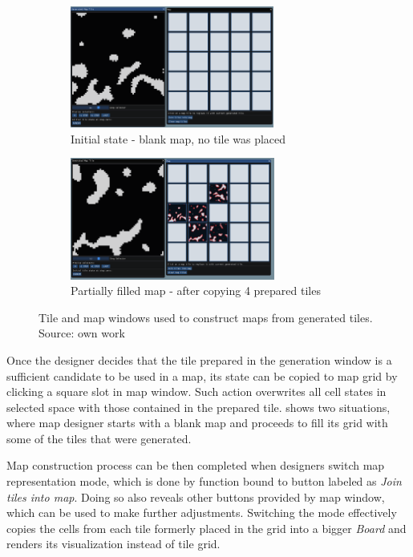 \documentclass[12pt]{report}
\begin{document}
\begin{figure}[H]
	\centering
	\begin{subfigure}[t]{0.9\textwidth}
		\centering
		\includegraphics[height=4cm]{images/mapnotiles}
		\caption{Initial state - blank map, no tile was placed} 
	\end{subfigure}  
	\begin{subfigure}[t]{0.9\textwidth}
		\centering
		\includegraphics[height=4cm]{images/map4tiles}
		\caption{Partially filled map - after copying 4 prepared tiles} 
	\end{subfigure} 
	\caption{Tile and map windows used to construct maps from generated tiles. Source: own work}
	\label{fig:map_merging}
\end{figure}

Once the designer decides that the tile prepared in the generation window is a sufficient candidate to be used in a map, its state can be copied to map grid by clicking a square slot in map window. Such action overwrites all cell states in selected space with those contained in the prepared tile.  shows two situations, where map designer starts with a blank map and proceeds to fill its grid with some of the tiles that were generated.

Map construction process can be then completed when designers switch map representation mode, which is done by function bound to button labeled as \textit{Join tiles into map}. Doing so also reveals other buttons provided by map window, which can be used to make further adjustments. Switching the mode effectively copies the cells from each tile formerly placed in the grid into a bigger \textit{Board} and renders its visualization instead of tile grid.
\end{document}
